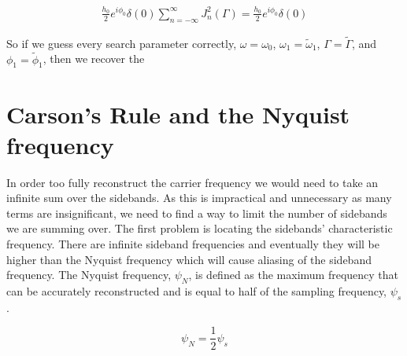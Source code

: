 \documentclass[onecolumn, groupedaddress, 10pt]{revtex4-1}
\begin{document}
\begin{align}
\frac{h_0}{2} e^{i\phi_0} \delta(0) \sum_{n=-\infty}^{\infty} J_n^2 (\Gamma) = \frac{h_0}{2} e^{i\phi_0} \delta(0)
\end{align}

So if we guess every search parameter correctly, $\omega = \omega_0$, $\omega_1 = \widetilde{\omega}_1$, $\Gamma = \widetilde{\Gamma}$, and $\phi_1 = \widetilde{\phi}_1$, then we recover the 







\section{Carson's Rule and the Nyquist frequency}
In order too fully reconstruct the carrier frequency we would need to take an infinite sum over the sidebands. As this is impractical and unnecessary as many terms are insignificant, we need to find a way to limit the number of sidebands we are summing over. The first problem is locating the sidebands' characteristic frequency. There are infinite sideband frequencies and eventually they will be higher than the Nyquist frequency which will cause aliasing of the sideband frequency. The Nyquist frequency, $\psi_N$, is defined as the maximum frequency that can be accurately reconstructed and is equal to half of the sampling frequency, $\psi_s$.

\begin{equation}
\psi_N = \frac{1}{2}\psi_s
\end{equation}
\end{document}
